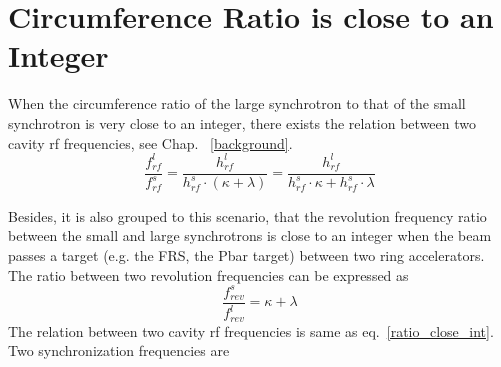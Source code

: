 \section{Circumference Ratio is close to an Integer}
\label{sec:close_to_int}
When the circumference ratio of the large synchrotron to that of the small synchrotron is very close to an integer, there exists the relation between two cavity rf frequencies, see Chap. ~\ref{background}. 
\begin{equation} 
\label{ratio_close_int}
\frac{f_{\mathit{rf}}^{l}}{f_{\mathit{rf}}^{s}}=\frac{h^l_\mathit{rf}}{h^s_\mathit{rf} \cdot ( \kappa+ \lambda)}=\frac{h^l_\mathit{rf}}{h^s_\mathit{rf} \cdot  \kappa+h^s_\mathit{rf} \cdot \lambda}
\end{equation}




Besides, it is also grouped to this scenario, that the revolution frequency ratio between the small and large synchrotrons is close to an integer when the beam passes a target (e.g. the FRS, the Pbar target) between two ring accelerators. The ratio between two revolution frequencies can be expressed as
\begin{equation} 
\frac{f_{\mathit{rev}}^{s}}{f_{\mathit{rev}}^{l}}=\kappa+ \lambda\label{close_to_interger1}
\end{equation}
The relation between two cavity rf frequencies is same as eq.~\ref{ratio_close_int}. Two synchronization frequencies are

